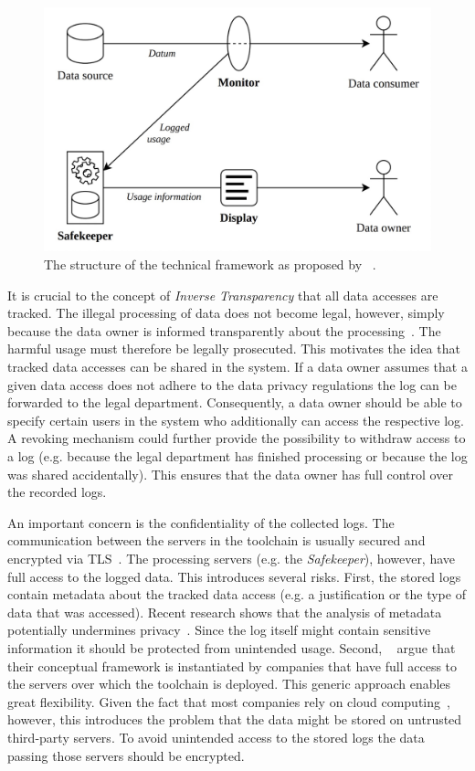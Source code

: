 \documentclass[../main.tex]{subfiles}
\begin{document}
\begin{figure}[ht]
    \includegraphics[scale=0.15]{../img/01/toolchain.jpg}
    \centering
    \caption[Existing toolchain]{The structure of the technical framework as proposed by \citeauthor{Zieglmeier2021}~\cite{Zieglmeier2021}.}
    \label{fig:toolchain}
\end{figure}

It is crucial to the concept of \emph{Inverse Transparency} that all data accesses are tracked.
The illegal processing of data does not become legal, however, simply because the data owner is informed transparently about the processing~\cite{Boes2022}.
The harmful usage must therefore be legally prosecuted.
This motivates the idea that tracked data accesses can be shared in the system.
If a data owner assumes that a given data access does not adhere to the data privacy regulations the log can be forwarded to the legal department.
Consequently, a data owner should be able to specify certain users in the system who additionally can access the respective log.
A revoking mechanism could further provide the possibility to withdraw access to a log (e.g. because the legal department has finished processing or because the log was shared accidentally).
This ensures that the data owner has full control over the recorded logs.

An important concern is the confidentiality of the collected logs.
The communication between the servers in the toolchain is usually secured and encrypted via TLS~\cite{Rescorla2000}.
The processing servers (e.g. the \emph{Safekeeper}), however, have full access to the logged data.
This introduces several risks.
First, the stored logs contain metadata about the tracked data access (e.g. a justification or the type of data that was accessed).
Recent research shows that the analysis of metadata potentially undermines privacy~\cite{Greschbach2012,Mayer2016}.
Since the log itself might contain sensitive information it should be protected from unintended usage.
Second, \citeauthor{Zieglmeier2021}~\cite{Zieglmeier2021} argue that their conceptual framework is instantiated by companies that have full access to the servers over which the toolchain is deployed.
This generic approach enables great flexibility.
Given the fact that most companies rely on cloud computing~\cite{Weber2021}, however, this introduces the problem that the data might be stored on untrusted third-party servers.
To avoid unintended access to the stored logs the data passing those servers should be encrypted.
\end{document}
